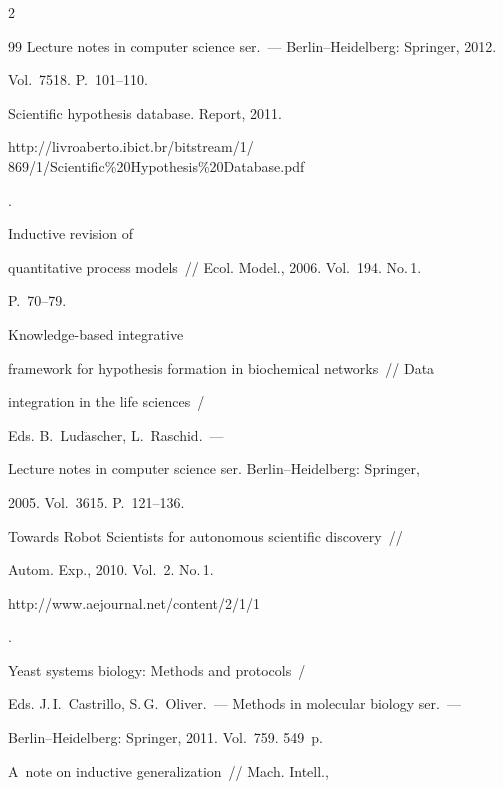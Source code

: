 \begin{multicols}{2}
{{\begin{thebibliography}{99}
Lecture notes in computer science ser.~--- Berlin--Heidelberg: Springer, 2012.


Vol.~7518. P.~101--110.




 Scientific hypothesis database. Report, 2011.


{\sf


http://livroaberto.ibict.br/bitstream/1/ 869/1/Scientific\%20Hypothesis\%20Database.pdf}.




 Inductive revision of


quantitative process models~// Ecol. Model., 2006. Vol.~194. No.\,1.


P.~70--79.




 Knowledge-based integrative


framework for hypothesis formation in biochemical networks~// Data


integration in the life sciences~/


Eds. B.~Lud$\ddot{\mbox{a}}$scher, L.~Raschid.~---


Lecture notes in computer science ser. Berlin--Heidelberg: Springer,


2005. Vol.~3615. P.~121--136.







 Towards Robot Scientists for autonomous scientific discovery~//


Autom. Exp., 2010.  Vol.~2. No.\,1. {\sf


http://www.aejournal.net/content/2/1/1}.




Yeast systems biology: Methods and protocols~/


Eds. J.\,I.~Castrillo,  S.\,G.~Oliver.~---  Methods in molecular biology ser.~---


Berlin--Heidelberg: Springer, 2011. Vol.~759. 549~p.




 A~note on inductive generalization~// Mach. Intell.,



\end{thebibliography}}}
\end{multicols}
